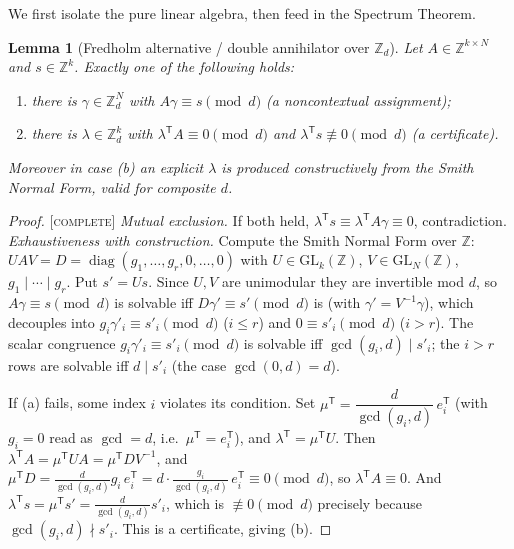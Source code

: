 \documentclass[11pt]{article}
\newtheorem{lemma}[theorem]{Lemma}
\theoremstyle{definition}
\theoremstyle{remark}
\newcommand{\Z}{\mathbb{Z}}
\newcommand{\Zd}{\Z_d}
\newcommand{\CO}{\textnormal{\textsc{[complete]}}}
\begin{document}
We first isolate the pure linear algebra, then feed in the Spectrum Theorem.

\begin{lemma}[Fredholm alternative / double annihilator over $\Zd$]\label{lem:snf}
Let $A\in\Z^{k\times N}$ and $s\in\Z^{k}$. Exactly one of the following holds:
\begin{enumerate}[label=(\alph*),leftmargin=2.2em,itemsep=1pt]
\item there is $\gamma\in\Zd^{N}$ with $A\gamma\equiv s\pmod d$ \emph{(a noncontextual assignment)};
\item there is $\lambda\in\Zd^{k}$ with $\lambda^{\mathsf T}A\equiv0\pmod d$ and
$\lambda^{\mathsf T}s\not\equiv0\pmod d$ \emph{(a certificate)}.
\end{enumerate}
Moreover in case (b) an explicit $\lambda$ is produced constructively from the Smith Normal Form,
valid for \emph{composite} $d$.
\end{lemma}
\begin{proof}
\CO{} \emph{Mutual exclusion.} If both held, $\lambda^{\mathsf T}s\equiv\lambda^{\mathsf
T}A\gamma\equiv0$, contradiction. \emph{Exhaustiveness with construction.} Compute the Smith Normal
Form over $\Z$: $UAV=D=\operatorname{diag}(g_1,\dots,g_r,0,\dots,0)$ with $U\in\mathrm{GL}_k(\Z)$,
$V\in\mathrm{GL}_N(\Z)$, $g_1\mid\cdots\mid g_r$. Put $s'=Us$. Since $U,V$ are unimodular they are
invertible mod $d$, so $A\gamma\equiv s\pmod d$ is solvable iff $D\gamma'\equiv s'\pmod d$ is (with
$\gamma'=V^{-1}\gamma$), which decouples into $g_i\gamma'_i\equiv s'_i\pmod d$ ($i\le r$) and
$0\equiv s'_i\pmod d$ ($i>r$). The scalar congruence $g_i\gamma'_i\equiv s'_i\pmod d$ is solvable iff
$\gcd(g_i,d)\mid s'_i$; the $i>r$ rows are solvable iff $d\mid s'_i$ (the case $\gcd(0,d)=d$).

If (a) fails, some index $i$ violates its condition. Set $\mu^{\mathsf T}=\dfrac{d}{\gcd(g_i,d)}\,
e_i^{\mathsf T}$ (with $g_i=0$ read as $\gcd=d$, i.e.\ $\mu^{\mathsf T}=e_i^{\mathsf T}$), and
$\lambda^{\mathsf T}=\mu^{\mathsf T}U$. Then
$\lambda^{\mathsf T}A=\mu^{\mathsf T}UA=\mu^{\mathsf T}DV^{-1}$, and
$\mu^{\mathsf T}D=\frac{d}{\gcd(g_i,d)}g_i\,e_i^{\mathsf T}=d\cdot\frac{g_i}{\gcd(g_i,d)}\,
e_i^{\mathsf T}\equiv0\pmod d$, so $\lambda^{\mathsf T}A\equiv0$. And
$\lambda^{\mathsf T}s=\mu^{\mathsf T}s'=\frac{d}{\gcd(g_i,d)}s'_i$, which is
$\not\equiv0\pmod d$ precisely because $\gcd(g_i,d)\nmid s'_i$. This is a certificate, giving (b).
\end{proof}
\end{document}
